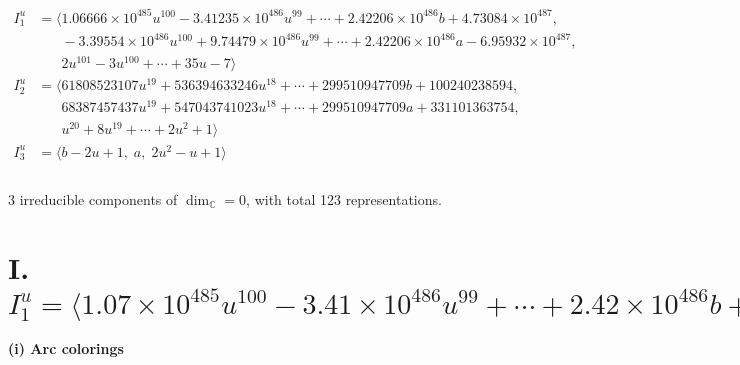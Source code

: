 \documentclass[1p]{elsarticle_modified}
\theoremstyle{definition}
\begin{document}
\begin{align*}
I^u_{1}&=\langle 
1.06666\times10^{485} u^{100}-3.41235\times10^{486} u^{99}+\cdots+2.42206\times10^{486} b+4.73084\times10^{487},\\
\phantom{I^u_{1}}&\phantom{= \langle  }-3.39554\times10^{486} u^{100}+9.74479\times10^{486} u^{99}+\cdots+2.42206\times10^{486} a-6.95932\times10^{487},\\
\phantom{I^u_{1}}&\phantom{= \langle  }2 u^{101}-3 u^{100}+\cdots+35 u-7\rangle \\
I^u_{2}&=\langle 
61808523107 u^{19}+536394633246 u^{18}+\cdots+299510947709 b+100240238594,\\
\phantom{I^u_{2}}&\phantom{= \langle  }68387457437 u^{19}+547043741023 u^{18}+\cdots+299510947709 a+331101363754,\\
\phantom{I^u_{2}}&\phantom{= \langle  }u^{20}+8 u^{19}+\cdots+2 u^2+1\rangle \\
I^u_{3}&=\langle 
b-2 u+1,\;a,\;2 u^2- u+1\rangle \\
\\
\end{align*}
\raggedright * 3 irreducible components of $\dim_{\mathbb{C}}=0$, with total 123 representations.\\
\newpage
\renewcommand{\arraystretch}{1}
\centering \section*{I. $I^u_{1}= \langle 1.07\times10^{485} u^{100}-3.41\times10^{486} u^{99}+\cdots+2.42\times10^{486} b+4.73\times10^{487},\;-3.40\times10^{486} u^{100}+9.74\times10^{486} u^{99}+\cdots+2.42\times10^{486} a-6.96\times10^{487},\;2 u^{101}-3 u^{100}+\cdots+35 u-7 \rangle$}
\flushleft \textbf{(i) Arc colorings}\\
\end{document}
